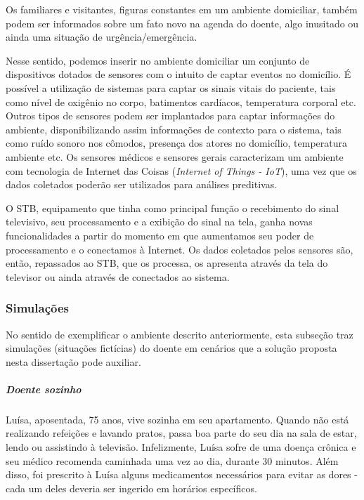 Os familiares e visitantes, figuras constantes em um ambiente domiciliar, também
podem ser informados sobre um fato novo na agenda do doente, algo inusitado ou 
ainda uma situação de urgência/emergência.

Nesse sentido, podemos inserir no ambiente domiciliar um conjunto de
dispositivos dotados de sensores com o intuito de captar eventos no domicílio. É
possível a utilização de sistemas para captar os sinais vitais do paciente, tais
como nível de oxigênio no corpo, batimentos cardíacos, temperatura corporal etc.
Outros tipos de sensores podem ser implantados para captar informações do
ambiente, disponibilizando assim informações de contexto para o sistema,  tais
como ruído sonoro nos cômodos, presença dos atores no domicílio, temperatura
ambiente etc. Os sensores médicos e sensores gerais caracterizam um  ambiente 
com tecnologia de Internet das Coisas (\textit{Internet of Things  - IoT}), uma
vez que os dados coletados poderão ser utilizados para análises preditivas.

O STB, equipamento que tinha como principal função o recebimento do sinal
televisivo, seu processamento e a exibição do sinal na tela, ganha novas
funcionalidades a partir do momento em que aumentamos seu  poder de
processamento e o conectamos à Internet. Os dados coletados pelos sensores são,
então, repassados ao STB, que os processa, os apresenta através da tela do
televisor ou ainda através de \smartphones[] conectados ao sistema.

\subsubsection{Simulações} \label{subsubsec:simulacoes-A}

No sentido de exemplificar o ambiente descrito anteriormente, esta subseção
traz simulações (situações fictícias) do doente em cenários que a solução
proposta nesta dissertação pode auxiliar.

\subparagraph{Doente sozinho}

Luísa, aposentada, 75 anos, vive sozinha em seu apartamento. Quando não está
realizando refeições e lavando pratos, passa boa parte do seu dia na sala de
estar, lendo ou assistindo à televisão. Infelizmente, Luísa sofre de uma doença 
crônica e seu médico recomenda caminhada uma vez ao dia, durante 30 minutos. 
Além disso, foi prescrito à Luísa alguns medicamentos necessários para evitar 
as dores - cada um deles deveria ser ingerido em horários específicos.

